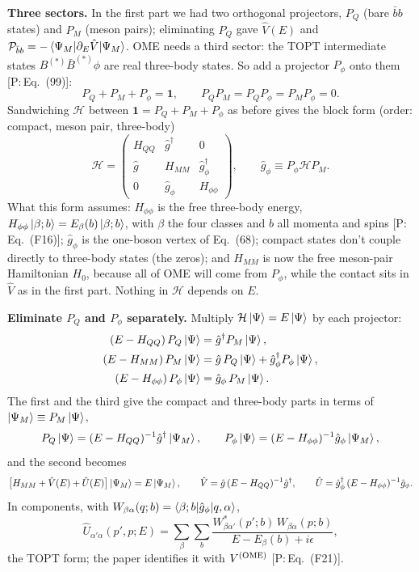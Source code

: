 \documentclass[11pt]{article}
\newcommand{\Pbb}{{\cal P}_{\bar bb}}
\newcommand{\tagP}[1]{\textcolor{blue!65!black}{\textsf{\small[P:\,#1]}}}
\newenvironment{aiadd}{\par}{\par}
\begin{document}
\begin{aiadd}
	\textbf{Three sectors.} In the first part we had two orthogonal projectors, $P_Q$ (bare $\bar bb$ states) and $P_M$ (meson pairs); eliminating $P_Q$ gave $\hat V(E)$ and $\Pbb=-\braket{\Psi_M|\partial_E\hat V|\Psi_M}$. OME needs a third sector: the TOPT intermediate states $B^{(*)}\bar B^{(*)}\phi$ are real three-body states. So add a projector $P_\phi$ onto them \tagP{Eq.~(99)}:
	\[
		P_Q+P_M+P_\phi=\bm 1,\qquad P_QP_M=P_QP_\phi=P_MP_\phi=0 .
	\]
	Sandwiching $\mathcal H$ between $\bm 1=P_Q+P_M+P_\phi$ as before gives the block form (order: compact, meson pair, three-body)
	\[
		\mathcal H=\begin{pmatrix}H_{QQ}&\hat g^\dagger&0\\ \hat g&H_{MM}&\hat g_\phi^\dagger\\ 0&\hat g_\phi&H_{\phi\phi}\end{pmatrix},\qquad \hat g_\phi\equiv P_\phi\mathcal HP_M .
	\]
	What this form assumes: $H_{\phi\phi}$ is the free three-body energy, $H_{\phi\phi}\ket{\beta;b}=E_\beta(b)\ket{\beta;b}$, with $\beta$ the four classes and $b$ all momenta and spins \tagP{Eq.~(F16)}; $\hat g_\phi$ is the one-boson vertex of Eq.~(68); compact states don't couple directly to three-body states (the zeros); and $H_{MM}$ is now the free meson-pair Hamiltonian $H_0$, because all of OME will come from $P_\phi$, while the contact sits in $\hat V$ as in the first part. Nothing in $\mathcal H$ depends on $E$.

	\textbf{Eliminate $P_Q$ and $P_\phi$ separately.} Multiply $\mathcal H\ket\Psi=E\ket\Psi$ by each projector:
	\begin{align*}
		(E-H_{QQ})\,P_Q\ket\Psi          & =\hat g^\dagger P_M\ket\Psi,                             \\
		(E-H_{MM})\,P_M\ket\Psi          & =\hat g\,P_Q\ket\Psi+\hat g_\phi^\dagger P_\phi\ket\Psi, \\
		(E-H_{\phi\phi})\,P_\phi\ket\Psi & =\hat g_\phi\,P_M\ket\Psi .
	\end{align*}
	The first and the third give the compact and three-body parts in terms of $\ket{\Psi_M}\equiv P_M\ket\Psi$,
	\[
		P_Q\ket\Psi=(E-H_{QQ})^{-1}\hat g^\dagger\ket{\Psi_M},\qquad P_\phi\ket\Psi=(E-H_{\phi\phi})^{-1}\hat g_\phi\ket{\Psi_M},
	\]
	and the second becomes
	\[
		\big[H_{MM}+\hat V(E)+\hat U(E)\big]\ket{\Psi_M}=E\ket{\Psi_M},\qquad
		\hat V=\hat g\,(E-H_{QQ})^{-1}\hat g^\dagger,\qquad
		\hat U=\hat g_\phi^\dagger\,(E-H_{\phi\phi})^{-1}\hat g_\phi .
	\]
	In components, with $W_{\beta\alpha}(q;b)=\braket{\beta;b|\hat g_\phi|q,\alpha}$,
	\[
		\hat U_{\alpha'\alpha}(p',p;E)=\sum_\beta\sum_b\frac{W^*_{\beta\alpha'}(p';b)\,W_{\beta\alpha}(p;b)}{E-E_\beta(b)+i\epsilon},
	\]
	the TOPT form; the paper identifies it with $V^{\rm (OME)}$ \tagP{Eq.~(F21)}.


\end{aiadd}
\end{document}
